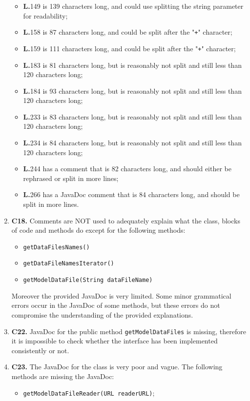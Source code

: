 \begin{enumerate}
\begin{itemize}
	\item \textbf{L.}149 is 139 characters long, and could use splitting the string parameter for readability;
	\item \textbf{L.}158 is 87 characters long, and could be split after the "\texttt{+}" character;
	\item \textbf{L.}159 is 111 characters long, and could be split after the "\texttt{+}" character;
	\item \textbf{L.}183 is 81 characters long, but is reasonably not split and still less than 120 characters long;
	\item \textbf{L.}184 is 93 characters long, but is reasonably not split and still less than 120 characters long;
	\item \textbf{L.}233 is 83 characters long, but is reasonably not split and still less than 120 characters long;
	\item \textbf{L.}234 is 84 characters long, but is reasonably not split and still less than 120 characters long;
	\item \textbf{L.}244 has a comment that is 82 characters long, and should either be rephrased or split in more lines;
	\item \textbf{L.}266 has a JavaDoc comment that is 84 characters long, and should be split in more lines.
	\end{itemize}
\item \textbf{C18.} Comments are NOT used to adequately explain what the class, blocks of code and methods do except for the following methods:
	\begin{itemize}
	\item \texttt{getDataFilesNames()}
	\item \texttt{getDataFileNamesIterator()}
	\item \texttt{getModelDataFile(String dataFileName)}
	\end{itemize}
Moreover the provided JavaDoc is very limited. Some minor grammatical errors occur in the JavaDoc of some methods, but these errors do not compromise the understanding of the provided explanations.
\item \textbf{C22.} JavaDoc for the public method \texttt{getModelDataFiles} is missing, therefore it is impossible to check whether the interface has been implemented consistently or not.
\item \textbf{C23.} The JavaDoc for the class is very poor and vague. The following methods are missing the JavaDoc:
	\begin{itemize}
	\item \texttt{getModelDataFileReader(URL readerURL)};

\end{itemize}
\end{enumerate}
